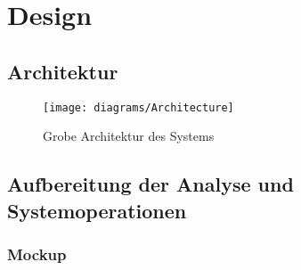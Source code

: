 \chapter{Design}\label{chap:Design}

\section{Architektur}
\begin{figure}[h]
  \begin{center}
    \texttt{[image: diagrams/Architecture]}
    \caption{Grobe Architektur des Systems}
  \end{center}
\end{figure}

\section{Aufbereitung der Analyse und Systemoperationen}

\subsection{Mockup}

